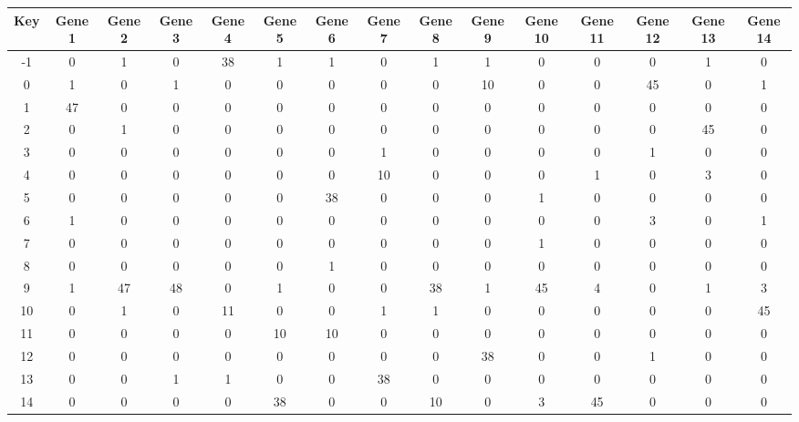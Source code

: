 \begin{tabular}{|c|c|c|c|c|c|c|c|c|c|c|c|c|c|c|}
\hline
Key & Gene 1 & Gene 2 & Gene 3 & Gene 4 & Gene 5 & Gene 6 & Gene 7 & Gene 8 & Gene 9 & Gene 10 & Gene 11 & Gene 12 & Gene 13 & Gene 14 \\
\hline
-1 & 0 & 1 & 0 & 38 & 1 & 1 & 0 & 1 & 1 & 0 & 0 & 0 & 1 & 0 \\
0 & 1 & 0 & 1 & 0 & 0 & 0 & 0 & 0 & 10 & 0 & 0 & 45 & 0 & 1 \\
1 & 47 & 0 & 0 & 0 & 0 & 0 & 0 & 0 & 0 & 0 & 0 & 0 & 0 & 0 \\
2 & 0 & 1 & 0 & 0 & 0 & 0 & 0 & 0 & 0 & 0 & 0 & 0 & 45 & 0 \\
3 & 0 & 0 & 0 & 0 & 0 & 0 & 1 & 0 & 0 & 0 & 0 & 1 & 0 & 0 \\
4 & 0 & 0 & 0 & 0 & 0 & 0 & 10 & 0 & 0 & 0 & 1 & 0 & 3 & 0 \\
5 & 0 & 0 & 0 & 0 & 0 & 38 & 0 & 0 & 0 & 1 & 0 & 0 & 0 & 0 \\
6 & 1 & 0 & 0 & 0 & 0 & 0 & 0 & 0 & 0 & 0 & 0 & 3 & 0 & 1 \\
7 & 0 & 0 & 0 & 0 & 0 & 0 & 0 & 0 & 0 & 1 & 0 & 0 & 0 & 0 \\
8 & 0 & 0 & 0 & 0 & 0 & 1 & 0 & 0 & 0 & 0 & 0 & 0 & 0 & 0 \\
9 & 1 & 47 & 48 & 0 & 1 & 0 & 0 & 38 & 1 & 45 & 4 & 0 & 1 & 3 \\
10 & 0 & 1 & 0 & 11 & 0 & 0 & 1 & 1 & 0 & 0 & 0 & 0 & 0 & 45 \\
11 & 0 & 0 & 0 & 0 & 10 & 10 & 0 & 0 & 0 & 0 & 0 & 0 & 0 & 0 \\
12 & 0 & 0 & 0 & 0 & 0 & 0 & 0 & 0 & 38 & 0 & 0 & 1 & 0 & 0 \\
13 & 0 & 0 & 1 & 1 & 0 & 0 & 38 & 0 & 0 & 0 & 0 & 0 & 0 & 0 \\
14 & 0 & 0 & 0 & 0 & 38 & 0 & 0 & 10 & 0 & 3 & 45 & 0 & 0 & 0 \\
\hline
\end{tabular}